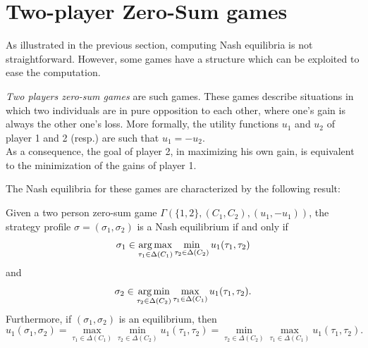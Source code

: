 %
%
%
%
% 



\section{Two-player Zero-Sum games}

As illustrated in the previous section, computing Nash
 equilibria is not straightforward. However,
  some games have a structure which can be exploited
   to ease the computation.

\emph{Two players zero-sum games} are such games.
 These games describe situations in which two individuals are 
 in pure opposition to each other, where one's gain is always the
  other one's loss. More formally, the utility functions $u_1$ and $u_2$ of player 1 and 2 (resp.) are such that $u_1 = - u_2$.\\
As a consequence, the goal of player 2, in maximizing his own gain, is equivalent to the minimization of the gains of player 1. 

The Nash equilibria for these games are characterized by the following result:
\begin{theorem}
Given a two person zero-sum game $\Gamma(\{1,2\}, (C_1, C_2), (u_1, -u_1))$, the strategy profile $\sigma = (\sigma_1, \sigma_2)$ is a Nash equilibrium if and only if 
$$\sigma_1 \in \operatorname*{arg\,max}_{\tau_1 \in \Delta(C_1)} \min_{\tau_2 \in \Delta(C_2)} u_1(\tau_1, \tau_2) $$
and
$$\sigma_2 \in \operatorname*{arg\,min}_{\tau_2 \in \Delta(C_2)} \max_{\tau_1 \in \Delta(C_1)} u_1(\tau_1, \tau_2). $$
Furthermore, if $(\sigma_1, \sigma_2)$ is an equilibrium, then
$$u_1(\sigma_1, \sigma_2) = \max_{\tau_1 \in \Delta(C_1)} \min_{\tau_2 \in \Delta(C_2)} u_1(\tau_1, \tau_2) = \min_{\tau_2 \in  \Delta(C_2)} \max_{\tau_1 \in \Delta(C_1)}  u_1(\tau_1, \tau_2).$$
\label{chap3:thm:2P0S}
\end{theorem} 

